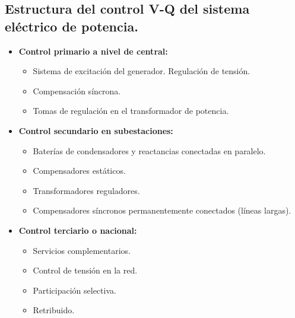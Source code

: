 		\subsection{Estructura del control V-Q del sistema eléctrico de potencia.}
			\begin{itemize}
				\item \textbf{Control primario a nivel de central:}
					\begin{itemize}
						\item Sistema de excitación del generador. Regulación de tensión.
						\item Compensación síncrona.
						\item Tomas de regulación en el transformador de potencia.
					\end{itemize}
				\item \textbf{Control secundario en subestaciones:}
					\begin{itemize}
						\item Baterías de condensadores y reactancias conectadas en paralelo.
						\item Compensadores estáticos.
						\item Transformadores reguladores.
						\item Compensadores síncronos permanentemente conectados (líneas largas).
					\end{itemize}
				\item \textbf{Control terciario o nacional:}
					\begin{itemize}
						\item Servicios complementarios.
						\item Control de tensión en la red.
						\item Participación selectiva.
						\item Retribuido.
					\end{itemize}
			\end{itemize}

